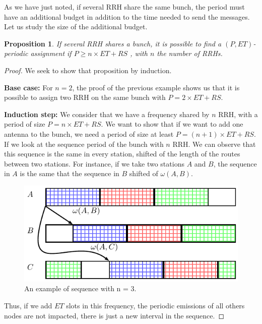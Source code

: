 \documentclass[a4paper,10pt,english]{article}
\newtheorem{prop}{Proposition}
\begin{document}
 
 
 As we have just noted, if several RRH share the same bunch, the period must have an additional budget in addition to the time needed to send the messages. Let us study the size of the additional budget.
 \begin{prop}
 If several RRH shares a bunch, it is possible to find a $(P,ET)$-periodic assignment if $P \ge n\times ET + RS$ , with $n$ the number of RRHs.
 \end{prop}
 \begin{proof}
 We seek to show that proposition by induction.
 
 {\bf Base case:} For $n = 2$, the proof of the previous example shows us that it is possible to assign two RRH on the same bunch with $P = 2\times ET + RS$.
 
 {\bf Induction step:}  We consider that we have a frequency shared by $n$ RRH, with a period of size $P= n\times ET + RS$. We want to show that if we want to add one antenna to the bunch, we need a period of size at least $P = (n+1)\times ET + RS$. If we look at the sequence period of the bunch with $n$ RRH. We can observe that this sequence is the same in every station, shifted of the length of the routes between two stations. For instance, if we take two stations $A$ and $B$, the sequence in $A$ is the same that the sequence in $B$ shifted of $\omega(A,B)$.
 
   \begin{figure}[h]
\centering
      \includegraphics[scale=0.7]{period1.pdf}
     \caption{An example of sequence with n = 3.}   \label{fig:proofperiod1}
  \end{figure}
   
 Thus, if we add $ET$ slots in this frequency, the periodic emissions of all others nodes are not impacted, there is just a new interval in the sequence.
 

\end{proof}
\end{document}
